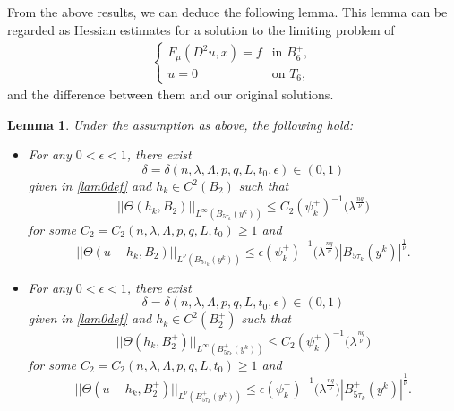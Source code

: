 \documentclass[11pt, reqno]{amsart}
\newtheorem{lemma}[theorem]{Lemma}
\numberwithin{equation}{section}
\begin{document}
From the above results, we can deduce the following lemma.
This lemma can be regarded as Hessian estimates for a solution to the limiting problem of 
\begin{align}\label{acsc}
\left\{ \begin{array}{ll}
F_{\mu}(D^{2}u,x) = f & \textrm{in $B_{6}^{+}, $}\\
u=0 & \textrm{on $T_{6}$,} 
\end{array} \right.
\end{align}
and the difference between them and our original solutions. 
\begin{lemma} \label{thetaest}Under the assumption as above, the following hold:
\begin{itemize}
\item[(a)] For any $0<\epsilon<1$, there exist
$$\delta=\delta(n, \lambda, \Lambda, p,q,L,t_{0},\epsilon)\in(0,1)$$
given in %
\eqref{lam0def} and $h_{k} \in C^{2}(B_{2})$ such that
$$||\Theta(h_{k},B_{2}) ||_{L^{\infty}(B_{5\tau_{k}}(y^{k}))}
\le C_2(\psi_{k}^{+})^{-1}\big( \lambda^{\frac{nq}{\nu}} \big)$$
for some $C_2=C_2(n,\lambda,\Lambda,p,q,L,t_{0})\ge1$ and
$$ ||\Theta(u-h_{k},B_{2}) ||_{L^{\nu}(B_{5\tau_{k}}(y^{k}))}
\le \epsilon(\psi_{k}^{+})^{-1}\big( \lambda^{\frac{nq}{\nu}} \big)|B_{5\tau_{k}}(y^{k})|^{\frac{1}{\nu}}.$$
\item[(b)] For any $0<\epsilon<1$, there exist
$$\delta=\delta(n, \lambda, \Lambda, p,q,L,t_{0},\epsilon)\in(0,1)$$
given in %
\eqref{lam0def} and $h_{k} \in C^{2}(B_{2}^{+})$ such that
$$||\Theta(h_{k},B_{2}^{+}) ||_{L^{\infty}(B_{5\tau_{k}}^{+}(y^{k}))}
\le C_2(\psi_{k}^{+})^{-1}\big( \lambda^{\frac{nq}{\nu}} \big)$$
for some $C_2=C_2(n,\lambda,\Lambda,p,q,L,t_{0})\ge 1$ and
$$ ||\Theta(u-h_{k},B_{2}^{+}) ||_{L^{\nu}(B_{5\tau_{k}}^{+}(y^{k}))}
\le \epsilon(\psi_{k}^{+})^{-1}\big( \lambda^{\frac{nq}{\nu}} \big)|B_{5\tau_{k}}^{+}(y^{k})|^{\frac{1}{\nu}}.$$
\end{itemize}
\end{lemma} 
\end{document}
